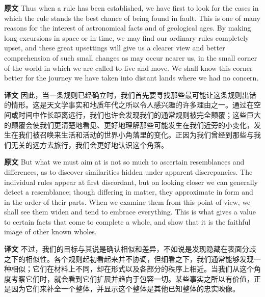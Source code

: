 \documentclass[UTF8,zihao=-4]{ctexart}
\newcommand{\BodyFont}{\fontsize{10.5pt}{15.5pt}\selectfont}
\newcommand{\origlabel}{\textbf{原文}\quad}
\newcommand{\translabel}{\textbf{译文}\quad}
\newenvironment{enblock}{\par\noindent\begingroup\BodyFont\origlabel}{\par\endgroup}
\newenvironment{zhblock}{\par\noindent\begingroup\BodyFont\translabel}{\par\endgroup\vspace{0.35em}}
\begin{document}
\begin{enblock}
Thus when a rule has been established, we have first to look for the cases in which the rule stands the best chance of being found in fault. This is one of many reasons for the interest of astronomical facts and of geological ages. By making long excursions in space or in time, we may find our ordinary rules completely upset, and these great upsettings will give us a clearer view and better comprehension of such small changes as may occur nearer us, in the small corner of the world in which we are called to live and move. We shall know this corner better for the journey we have taken into distant lands where we had no concern.
\end{enblock}
\begin{zhblock}
因此，当一条规则已经确立时，我们首先要寻找那些最可能让这条规则出错的情形。这是天文学事实和地质年代之所以令人感兴趣的许多理由之一。通过在空间或时间中作长距离远行，我们也许会发现我们的通常规则被完全颠覆；这些巨大的颠覆会使我们更清楚地看见、更好地理解那些可能发生在我们近旁的小变化，发生在我们被召唤来生活和活动的世界小角落里的变化。正因为我们曾经到那些与我们无关的远方去旅行，我们会更好地认识这个角落。\end{zhblock}

\begin{enblock}
But what we must aim at is not so much to ascertain resemblances and differences, as to discover similarities hidden under apparent discrepancies. The individual rules appear at first discordant, but on looking closer we can generally detect a resemblance; though differing in matter, they approximate in form and in the order of their parts. When we examine them from this point of view, we shall see them widen and tend to embrace everything. This is what gives a value to certain facts that come to complete a whole, and show that it is the faithful image of other known wholes.
\end{enblock}
\begin{zhblock}
不过，我们的目标与其说是确认相似和差异，不如说是发现隐藏在表面分歧之下的相似性。各个规则起初看起来并不协调，但细看之下，我们通常能够发现一种相似；它们在材料上不同，却在形式以及各部分的秩序上相近。当我们从这个角度考察它们时，就会看到它们扩展并趋向于包容一切。某些事实之所以有价值，正是因为它们来补全一个整体，并显示这个整体是其他已知整体的忠实映像。\end{zhblock}
\end{document}
